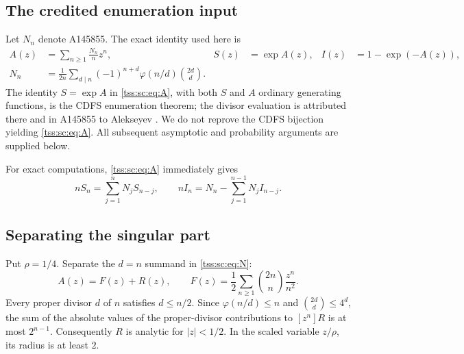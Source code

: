 \documentclass[11pt]{article}
\theoremstyle{remark}\newtheorem{remark}[theorem]{Remark}
\theoremstyle{definition}\newtheorem{definition}[theorem]{Definition}
\begin{document}
\subsection{The credited enumeration input}
Let $N_n$ denote A145855. The exact identity used here is
\begin{align}
 A(z)&=\sum_{n\geq1}\frac{N_n}{n}z^n,
 &S(z)&=\exp A(z), &I(z)&=1-\exp(-A(z)),\label{tss:sc:eq:A}\\
 N_n&=\frac1{2n}\sum_{d\mid n}(-1)^{n+d}\varphi(n/d)\binom{2d}{d}.
 \label{tss:sc:eq:N}
\end{align}
The identity $S=\exp A$ in \eqref{tss:sc:eq:A}, with both $S$ and $A$ ordinary generating functions, is the CDFS enumeration theorem; the divisor evaluation is attributed there and in A145855 to Alekseyev \cite{CDFS,OEIS}. We do not reprove the CDFS bijection yielding \eqref{tss:sc:eq:A}. All subsequent asymptotic and probability arguments are supplied below.

For exact computations, \eqref{tss:sc:eq:A} immediately gives
\begin{equation}\label{tss:sc:eq:recurrences}
 nS_n=\sum_{j=1}^nN_jS_{n-j},\qquad
 nI_n=N_n-\sum_{j=1}^{n-1}N_jI_{n-j}.
\end{equation}

\subsection{Separating the singular part}
Put $\rho=1/4$. Separate the $d=n$ summand in \eqref{tss:sc:eq:N}:
\begin{equation}\label{tss:sc:eq:split}
 A(z)=F(z)+R(z),\qquad
 F(z)=\frac12\sum_{n\geq1}\binom{2n}{n}\frac{z^n}{n^2}.
\end{equation}
Every proper divisor $d$ of $n$ satisfies $d\leq n/2$. Since $\varphi(n/d)\leq n$ and $\binom{2d}{d}\leq4^d$, the sum of the absolute values of the proper-divisor contributions to $[z^n]R$ is at most $2^{n-1}$. Consequently $R$ is analytic for $|z|<1/2$. In the scaled variable $z/\rho$, its radius is at least $2$.
\end{document}
